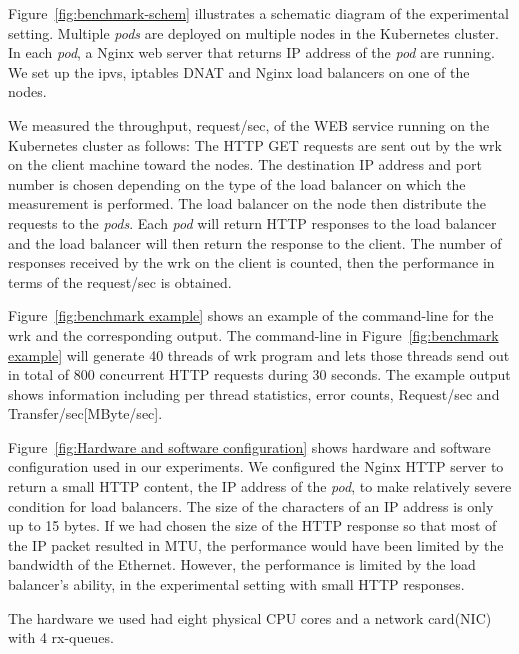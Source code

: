 Figure~\ref{fig:benchmark-schem} illustrates a schematic diagram of the experimental setting.
Multiple {\em pods} are deployed on multiple nodes in the Kubernetes cluster. 
In each {\em pod}, a Nginx web server that returns IP address of the {\em pod} are running.
We set up the ipvs, iptables DNAT and Nginx load balancers on one of the nodes. 

We measured the throughput, request/sec, of the WEB service running on the Kubernetes cluster as follows:
The HTTP GET requests are sent out by the wrk on the client machine toward the nodes.
The destination IP address and port number is chosen 
depending on the type of the load balancer on which the measurement is performed.
The load balancer on the node then distribute the requests to the {\em pods}.
Each {\em pod} will return HTTP responses to the load balancer and the load balancer will then 
return the response to the client.
The number of responses received by the wrk on the client is counted, 
then the performance in terms of the request/sec is obtained. 

Figure~\ref{fig:benchmark example} shows an example of the command-line for the wrk and the corresponding output.
The command-line in Figure~\ref{fig:benchmark example} will generate 40 threads of wrk program 
and lets those threads send out in total of 800 concurrent HTTP requests during 30 seconds.
The example output shows information including per thread statistics, error counts, Request/sec and Transfer/sec[MByte/sec].

Figure~\ref{fig:Hardware and software configuration} shows hardware and software configuration used in our experiments.
We configured the Nginx HTTP server to return a small HTTP content, 
the IP address of the {\em pod}, to make relatively severe condition for load balancers. 
The size of the characters of an IP address is only up to 15 bytes.
If we had chosen the size of the HTTP response so that most of the IP packet resulted in MTU, 
the performance would have been limited by the bandwidth of the Ethernet.
However, the performance is limited by the load balancer's ability, in the experimental setting with small HTTP responses.

The hardware we used had eight physical CPU cores and a network card(NIC) with 4 rx-queues.

